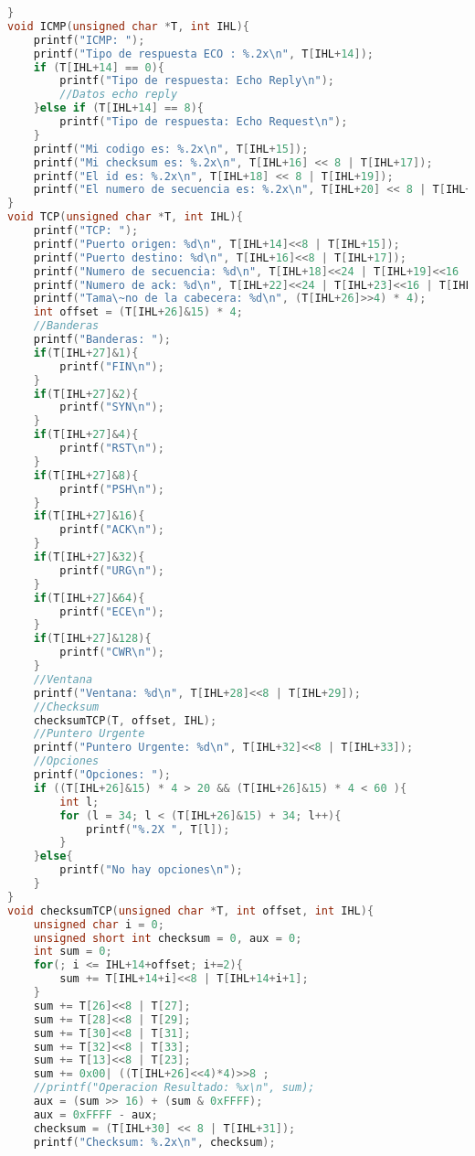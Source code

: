 \begin{lstlisting}[language={C}, caption={Analizador de tramas en C}, label={Script}]
}
void ICMP(unsigned char *T, int IHL){
    printf("ICMP: ");
    printf("Tipo de respuesta ECO : %.2x\n", T[IHL+14]);
    if (T[IHL+14] == 0){
        printf("Tipo de respuesta: Echo Reply\n");
        //Datos echo reply
    }else if (T[IHL+14] == 8){
        printf("Tipo de respuesta: Echo Request\n");
    }
    printf("Mi codigo es: %.2x\n", T[IHL+15]);
    printf("Mi checksum es: %.2x\n", T[IHL+16] << 8 | T[IHL+17]);
    printf("El id es: %.2x\n", T[IHL+18] << 8 | T[IHL+19]);
    printf("El numero de secuencia es: %.2x\n", T[IHL+20] << 8 | T[IHL+21]);
}
void TCP(unsigned char *T, int IHL){
    printf("TCP: ");
    printf("Puerto origen: %d\n", T[IHL+14]<<8 | T[IHL+15]);
    printf("Puerto destino: %d\n", T[IHL+16]<<8 | T[IHL+17]);
    printf("Numero de secuencia: %d\n", T[IHL+18]<<24 | T[IHL+19]<<16 | T[IHL+20]<<8 | T[IHL+21]);
    printf("Numero de ack: %d\n", T[IHL+22]<<24 | T[IHL+23]<<16 | T[IHL+24]<<8 | T[IHL+25]);
    printf("Tama\~no de la cabecera: %d\n", (T[IHL+26]>>4) * 4);
    int offset = (T[IHL+26]&15) * 4;
    //Banderas
    printf("Banderas: ");
    if(T[IHL+27]&1){
        printf("FIN\n");
    }
    if(T[IHL+27]&2){
        printf("SYN\n");
    }
    if(T[IHL+27]&4){
        printf("RST\n");
    }
    if(T[IHL+27]&8){
        printf("PSH\n");
    }
    if(T[IHL+27]&16){
        printf("ACK\n");
    }
    if(T[IHL+27]&32){
        printf("URG\n");
    }
    if(T[IHL+27]&64){
        printf("ECE\n");
    }
    if(T[IHL+27]&128){
        printf("CWR\n");
    }
    //Ventana
    printf("Ventana: %d\n", T[IHL+28]<<8 | T[IHL+29]);
    //Checksum
    checksumTCP(T, offset, IHL);
    //Puntero Urgente
    printf("Puntero Urgente: %d\n", T[IHL+32]<<8 | T[IHL+33]);
    //Opciones
    printf("Opciones: ");
    if ((T[IHL+26]&15) * 4 > 20 && (T[IHL+26]&15) * 4 < 60 ){
        int l;
        for (l = 34; l < (T[IHL+26]&15) + 34; l++){
            printf("%.2X ", T[l]);
        }
    }else{
        printf("No hay opciones\n");
    }
}
void checksumTCP(unsigned char *T, int offset, int IHL){
    unsigned char i = 0;
    unsigned short int checksum = 0, aux = 0;
    int sum = 0;
    for(; i <= IHL+14+offset; i+=2){
        sum += T[IHL+14+i]<<8 | T[IHL+14+i+1];
    }
    sum += T[26]<<8 | T[27];
    sum += T[28]<<8 | T[29];
    sum += T[30]<<8 | T[31];
    sum += T[32]<<8 | T[33];
    sum += T[13]<<8 | T[23];
    sum += 0x00| ((T[IHL+26]<<4)*4)>>8 ;
    //printf("Operacion Resultado: %x\n", sum);
    aux = (sum >> 16) + (sum & 0xFFFF);
    aux = 0xFFFF - aux;
    checksum = (T[IHL+30] << 8 | T[IHL+31]);
    printf("Checksum: %.2x\n", checksum);
    

\end{lstlisting}
